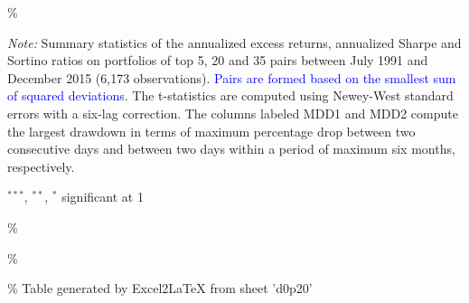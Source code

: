\documentclass[a4paper]{article}
\begin{document}
\begin{threeparttable}[H]
\begin{tabularx}{\textwidth}{@{\extracolsep{\fill}}llllllll@{}}
				\bottomrule
			\end{tabularx}\%
			\begin{tablenotes}
				\item \textit{Note:} \scriptsize \tiny Summary statistics of the annualized excess returns, annualized Sharpe and Sortino ratios on portfolios of top 5, 20 and 35 pairs between July 1991 and December 2015 (6,173 observations). \textcolor{blue} {Pairs are formed based on the smallest sum of squared deviations}. The t-statistics are computed using Newey-West standard errors with a six-lag correction. The columns labeled MDD1 and MDD2 compute the largest drawdown in terms of maximum percentage drop between two consecutive days and between two days within a period of maximum six months, respectively.
				\item \scriptsize $^{\ast\ast\ast}$, $^{\ast\ast}$, $^{\ast}$  significant at 1\\%
			\end{tablenotes}
			\label{tab:table101}\%
		\end{threeparttable}\%

	\medskip
	
	\% Table generated by Excel2LaTeX from sheet 'd0p20'
	
	
	
\end{document}
